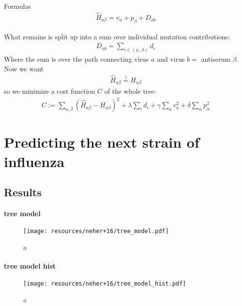 \documentclass{beamer}
\begin{document}
\begin{darkframes}
\begin{frame}[allowframebreaks]{Formulas}
      \begin{align}
        \hat{H}_{a\beta} = v_a + p_\beta + D_{ab}
      \end{align}


      What remains is split up into a sum over individual mutation contributions:
      \begin{align}
        D_{ab} = \sum_{i \in (a ... b)} d_i
      \end{align}
      Where the sum is over the path connecting virus $a$ and virus $ b \stackrel{}={}$ antiserum $\beta$. Now we want
      \begin{align}
        \hat{H}_{a\beta} \stackrel{!}={} {H}_{a\beta}
      \end{align}
      so we minimize a cost function $C$ of the whole tree:
      \begin{align}
        C := \sum_{a,\beta}( \hat{H}_{a\beta} - {H}_{a\beta})^2 + \lambda \sum_i d_i + \gamma \sum_a v_a^2 + \delta \sum_\alpha p_\alpha^2
      \end{align}

    \end{frame}













  \section{Predicting the next strain of influenza}

  \subsection{Results}



    \begin{frame}{\subsecname}
      \framesubtitle{tree model}
      \begin{figure}
        \texttt{[image: resources/neher+16/tree\_model.pdf]}
        \caption{\footnotesize a}
      \end{figure}
    \end{frame}

    \begin{frame}{\subsecname}
      \framesubtitle{tree model hist}
      \begin{figure}
        \texttt{[image: resources/neher+16/tree\_model\_hist.pdf]}
        \caption{\footnotesize a}
      \end{figure}
    \end{frame}


\end{darkframes}
\end{document}

